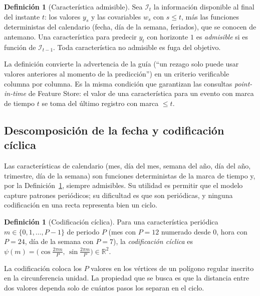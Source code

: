 \documentclass[11pt]{article}
\theoremstyle{definition}
\newtheorem{definicion}[teorema]{Definición}
\theoremstyle{remark}
\newcommand{\R}{\mathbb{R}}
\begin{document}
\begin{definicion}[Característica admisible]\label{def:admisible}
\noindent Sea $\mathcal{I}_{t}$ la información disponible al final del instante $t$: los valores $y_s$ y las covariables $w_s$ con $s\le t$, más las funciones deterministas del calendario (fecha, día de la semana, feriados), que se conocen de antemano. Una característica para predecir $y_t$ con horizonte $1$ es \emph{admisible} si es función de $\mathcal{I}_{t-1}$. Toda característica no admisible es fuga del objetivo.
\end{definicion}

\noindent La definición convierte la advertencia de la guía (``un rezago solo puede usar valores anteriores al momento de la predicción'') en un criterio verificable columna por columna. Es la misma condición que garantizan las consultas \emph{point-in-time} de Feature Store: el valor de una característica para un evento con marca de tiempo $t$ se toma del último registro con marca $\le t$.

\subsection{Descomposición de la fecha y codificación cíclica}\label{sec:fecha}

\noindent Las características de calendario (mes, día del mes, semana del año, día del año, trimestre, día de la semana) son funciones deterministas de la marca de tiempo y, por la Definición~\ref{def:admisible}, siempre admisibles. Su utilidad es permitir que el modelo capture patrones periódicos; su dificultad es que son periódicas, y ninguna codificación en una recta representa bien un ciclo.

\begin{definicion}[Codificación cíclica]\label{def:ciclica}
\noindent Para una característica periódica $m\in\{0,1,\dots,P-1\}$ de periodo $P$ (mes con $P=12$ numerado desde $0$, hora con $P=24$, día de la semana con $P=7$), la \emph{codificación cíclica} es $\psi(m)=\big(\cos\frac{2\pi m}{P},\,\sin\frac{2\pi m}{P}\big)\in\R^2$.
\end{definicion}

\noindent La codificación coloca los $P$ valores en los vértices de un polígono regular inscrito en la circunferencia unidad. La propiedad que se busca es que la distancia entre dos valores dependa solo de cuántos pasos los separan en el ciclo.
\end{document}
